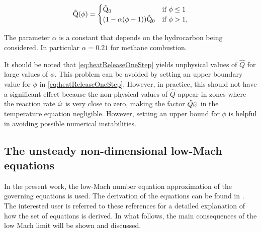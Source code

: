 \begin{equation}
	\hat{\mathrm{Q}}(\phi)=
	\begin{cases}
		\hat{\mathrm{Q}}_0                      & \text{if}~ \phi \leq 1 \\
		(1 - \alpha(\phi -1))\hat{\mathrm{Q}}_0 & \text{if}~\phi > 1,
	\end{cases}  \label{eq:heatReleaseOneStep}
\end{equation}

The parameter $\alpha$ is a constant that depends on the hydrocarbon being considered. In particular $\alpha = 0.21$ for methane combustion.


It should be noted that \cref{eq:heatReleaseOneStep} yields unphysical values of $\hat Q$ for large values of $\phi$. This problem can be avoided by setting an upper boundary value for $\phi$ in \cref{eq:heatReleaseOneStep}. However, in practice, this should not have a significant effect because the non-physical values of $\hat Q$ appear in zones where the reaction rate $\hat{\omega}$ is very close to zero, making the factor $\hat Q \hat{\omega}$ in the temperature equation negligible. However, setting an upper bound for $\phi$ is helpful in avoiding possible numerical instabilities.

\subsection{The unsteady non-dimensional low-Mach equations} \label{ssec:NonDimLowMachEquations}

In the present work, the low-Mach number equation approximation of the governing equations is used. The derivation of the equations can be found in \parencite{rehmEquationsMotionThermally1978, majdaDerivationNumericalSolution1985,mullerLowMachNumberAsymptoticsNavierStokes1998}. The interested user is referred to these references for a detailed explanation of how the set of equations is derived. In what follows, the main consequences of the low Mach limit will be shown and discussed.

